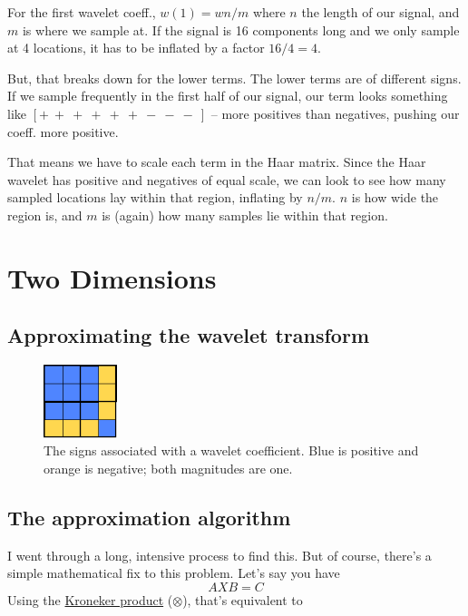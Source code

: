 \documentclass[leqno]{article}
\newcommand{\kron}{http://en.wikipedia.org/wiki/Kronecker\_product\#Matrix\_equations}
\begin{document}
            For the first wavelet coeff., $w(1) = w n / m$ where $n$ the length of our signal, and $m$ is where we sample at. If the signal is 16 components long and we only sample at 4 locations, it has to be inflated by a factor $16/4 = 4$.

            But, that breaks down for the lower terms. The lower terms are of different signs. If we sample frequently in the first half of our signal, our term looks something like $[+~+~+~+~+~+~-~-~-~]$ -- more positives than negatives, pushing our coeff. more positive. 

            That means we have to scale each term in the Haar matrix. Since the Haar wavelet has positive and negatives of equal scale, we can look to see how many sampled locations lay within that region, inflating by $n / m$. $n$ is how wide the region is, and $m$ is (again) how many samples lie within that region.





    \section{Two Dimensions}
        \subsection{Approximating the wavelet transform}
            \begin{figure}
                \begin{center}
                    \includegraphics[width=0.19\textwidth]{signs}
                \end{center}
                \caption{The signs associated with a wavelet coefficient. Blue is positive and orange is negative; both magnitudes are one.  }
                \label{fig:signs}    
            \end{figure}

        \subsection{The approximation algorithm}
            I went through a long, intensive process to find this. But of course, there's a simple mathematical fix to this problem. Let's say you have 
                $$AXB = C$$
                Using the \href{\kron}{Kroneker product} ($\otimes$), that's equivalent to
\end{document}
